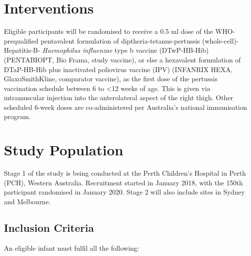 \documentclass{bmcart}
\begin{document}
\section*{Interventions}

Eligible participants will be randomised to receive a 0.5 ml dose of the WHO-prequalified pentavalent formulation of diptheria-tetanus-pertussis (whole-cell)-Hepatitis-B- \textit{Haemophilus influenzae} type b vaccine (DTwP-HB-Hib) (PENTABIO\textregistered PT, Bio Frama, study vaccine), or else a hexavalent formulation of DTaP-HB-Hib plus inactivated poliovirus vaccine (IPV) (INFANRIX HEXA\textregistered, GlaxoSmithKline, comparator vaccine), as the first dose of the pertussis vaccination schedule between 6 to \textless 12 weeks of age.
This is given via intramuscular injection into the anterolateral aspect of the right thigh.
Other scheduled 6-week doses are co-administered per Australia's national immunisation program.

\section*{Study Population}

Stage 1 of the study is being conducted at the Perth Children's Hospital in Perth (PCH), Western Australia.
Recruitment started in January 2018, with the 150th participant randomised in January 2020.
Stage 2 will also include sites in Sydney and Melbourne.

\subsection*{Inclusion Criteria}

An eligible infant must fulfil all the following:
\end{document}
